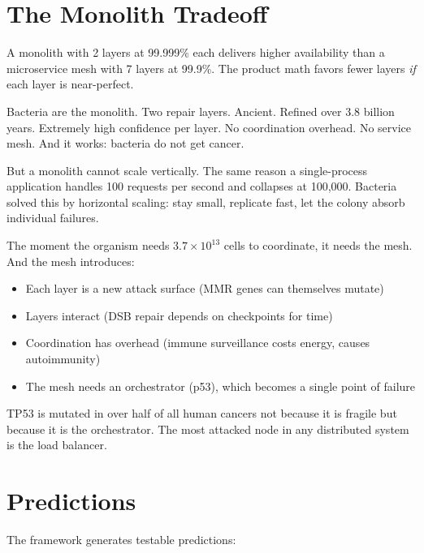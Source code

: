 \documentclass[11pt]{article}
\theoremstyle{definition}
\begin{document}
\section{The Monolith Tradeoff}
\label{sec:monolith}

A monolith with 2 layers at 99.999\% each delivers higher availability
than a microservice mesh with 7 layers at 99.9\%. The product math
favors fewer layers \emph{if} each layer is near-perfect.

Bacteria are the monolith. Two repair layers. Ancient. Refined over
3.8 billion years. Extremely high confidence per layer. No coordination
overhead. No service mesh. And it works: bacteria do not get cancer.

But a monolith cannot scale vertically. The same reason a single-process
application handles 100 requests per second and collapses at 100,000.
Bacteria solved this by horizontal scaling: stay small, replicate fast,
let the colony absorb individual failures.

The moment the organism needs $3.7 \times 10^{13}$ cells to
coordinate, it needs the mesh. And the mesh introduces:

\begin{itemize}
\item Each layer is a new attack surface (MMR genes can themselves mutate)
\item Layers interact (DSB repair depends on checkpoints for time)
\item Coordination has overhead (immune surveillance costs energy,
   causes autoimmunity)
\item The mesh needs an orchestrator (p53), which becomes a single
   point of failure
\end{itemize}

TP53 is mutated in over half of all human cancers not because it is
fragile but because it is the orchestrator. The most attacked node in
any distributed system is the load balancer.

\section{Predictions}
\label{sec:predictions}

The framework generates testable predictions:
\end{document}
